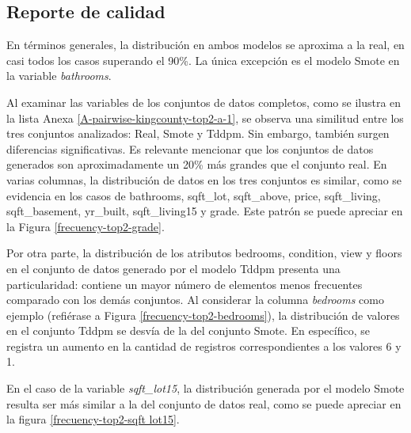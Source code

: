 
\newpage
\subsection{Reporte de calidad}
\label{calidad-kingcounty}
En términos generales, la distribución en ambos modelos se aproxima a la real, en casi todos los casos superando el 90\%. La única excepción es el modelo Smote en la variable \emph{bathrooms}.


\newpage
Al examinar las variables de los conjuntos de datos completos, como se ilustra en la lista Anexa \ref{A-pairwise-kingcounty-top2-a-1}, se observa una similitud entre los tres conjuntos analizados: Real, Smote y Tddpm. Sin embargo, también surgen diferencias significativas. Es relevante mencionar que los conjuntos de datos generados son aproximadamente un 20\% más grandes que el conjunto real. En varias columnas, la distribución de datos en los tres conjuntos es similar, como se evidencia en los casos de bathrooms, sqft\_lot, sqft\_above, price, sqft\_living, sqft\_basement, yr\_built, sqft\_living15 y grade. Este patrón se puede apreciar en la Figura \ref{frecuency-top2-grade}.



\newpage
Por otra parte, la distribución de los atributos bedrooms, condition, view y floors en el conjunto de datos generado por el modelo Tddpm presenta una particularidad: contiene un mayor número de elementos menos frecuentes comparado con los demás conjuntos. Al considerar la columna \emph{bedrooms} como ejemplo (refiérase a Figura \ref{frecuency-top2-bedrooms}), la distribución de valores en el conjunto Tddpm se desvía de la del conjunto Smote. En específico, se registra un aumento en la cantidad de registros correspondientes a los valores 6 y 1.



\newpage
En el caso de la variable \emph{sqft\_lot15}, la distribución generada por el modelo Smote resulta ser más similar a la del conjunto de datos real, como se puede apreciar en la figura \ref{frecuency-top2-sqft lot15}.


\newpage
